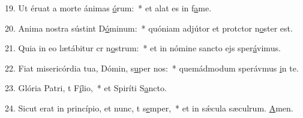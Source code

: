 19. Ut éruat a morte ánimas \uline{ó}rum:~* et alat es in f\uline{a}me.\par 
20. Anima nostra sústint D\uline{ó}minum:~* quóniam adjútor et protctor n\uline{o}ster est.\par 
21. Quia in eo lætábitur cr n\uline{o}strum:~* et in nómine sancto ejs sper\uline{á}vimus.\par 
22. Fiat misericórdia tua, Dómin, s\uline{u}per nos:~* quemádmodum sperávmus \uline{i}n te.\par 
23. Glória Patri, t F\uline{í}lio,~* et Spiríti S\uline{a}ncto.\par 
24. Sicut erat in princípio, et nunc, t s\uline{e}mper,~* et in sǽcula sæculrum. \uline{A}men.\par 
